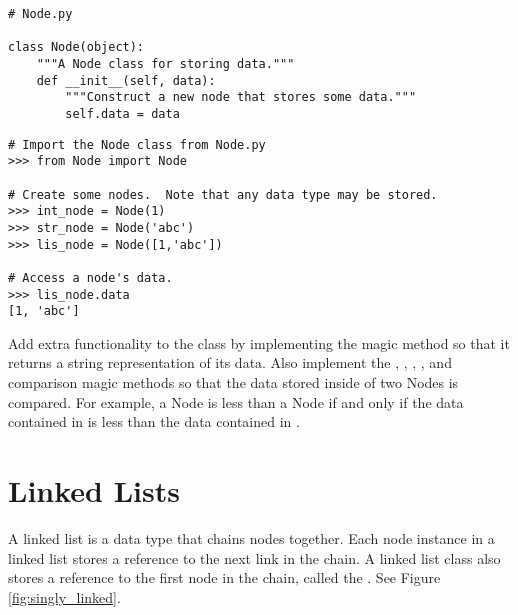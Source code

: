 \begin{lstlisting}
# Node.py

class Node(object):
	"""A Node class for storing data."""
	def __init__(self, data):
		"""Construct a new node that stores some data."""
		self.data = data
\end{lstlisting}

\begin{lstlisting}
# Import the Node class from Node.py
>>> from Node import Node

# Create some nodes.  Note that any data type may be stored.
>>> int_node = Node(1)
>>> str_node = Node('abc')
>>> lis_node = Node([1,'abc'])

# Access a node's data.
>>> lis_node.data
[1, 'abc']
\end{lstlisting}

\begin{problem}
Add extra functionality to the  class by implementing the  magic method so that it returns a string representation of its data.
Also implement the , , , , and  comparison magic methods so that the data stored inside of two Nodes is compared.
For example, a Node  is less than a Node  if and only if the data contained in  is less than the data contained in .
\end{problem}

\begin{comment}
\begin{problem}
Add a new class to \li{Node.py} called \li{StrNode} that only accepts strings as data.
Use inheritance and call the \li{Node} class constructor in the constructor for \li{StrNode}
(Hint: Use the \li{type} built-in function).

Implement the \li{__str__} magic method in the \li{Node} class so that it returns a string representation of its data.
\end{problem}
\end{comment}

\section*{Linked Lists}

A linked list is a data type that chains nodes together.
Each node instance in a linked list stores a reference to the next link in the chain.
A linked list class also stores a reference to the first node in the chain, called the .
See Figure \ref{fig:singly_linked}.

